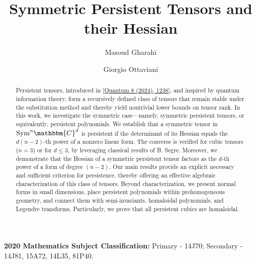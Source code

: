 \documentclass[aps,floatfix,groupedaddress,superscriptaddress,longbibliography,footinbib,notitlepage,showpacs]{revtex4-1}
\begin{document}

\title{Symmetric Persistent Tensors and their Hessian}

\author{Masoud Gharahi} %
\author{Giorgio Ottaviani}

\begin{abstract}
Persistent tensors, introduced in [\href{https://doi.org/10.22331/q-2024-01-31-1238}{Quantum 8 (2024), 1238}], and inspired by quantum information theory, form a recursively defined class of tensors that remain stable under the substitution method and thereby yield nontrivial lower bounds on tensor rank. In this work, we investigate the symmetric case—namely, symmetric persistent tensors, or equivalently, persistent polynomials. We establish that a symmetric tensor in $\mathrm{Sym}^n \mathbbm{C}^d$ is persistent if the determinant of its Hessian equals the $d(n-2)$-th power of a nonzero linear form. The converse is verified for cubic tensors ($n=3$) or for $d \leq 3$, by leveraging classical results of B. Segre. Moreover, we demonstrate that the Hessian of a symmetric persistent tensor factors as the $d$-th power of a form of degree $(n-2)$. Our main results provide an explicit necessary and sufficient criterion for persistence, thereby offering an effective algebraic characterization of this class of tensors. Beyond characterization, we present normal forms in small dimensions, place persistent polynomials within prehomogeneous geometry, and connect them with semi-invariants, homaloidal polynomials, and Legendre transforms. Particularly, we prove that all persistent cubics are homaloidal.
\end{abstract}

\maketitle

\noindent\textbf{2020 Mathematics Subject Classification:} 
Primary - 14J70; Secondary - 14J81, 15A72, 14L35, 81P40. \\
\end{document}
